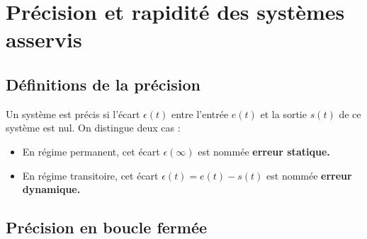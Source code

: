 \chapter{Précision et rapidité des systèmes asservis\label{chap-perf}}

\minitoc
\newpage

\section{Définitions de la précision}

Un système est précis si l'écart $\epsilon(t)$ entre l'entrée $e(t)$ et la sortie $s(t)$ 
de ce système est nul.
On distingue deux cas :
\begin{itemize}
    \item En régime permanent, cet écart $\epsilon(\infty)$ est nommée \textbf{erreur statique.}
    \item En régime transitoire, cet écart $\epsilon(t)=e(t)-s(t)$ est nommée \textbf{erreur dynamique.}
\end{itemize}

\section{Précision en boucle fermée}






